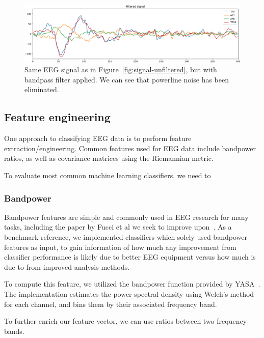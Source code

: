         \begin{figure}[h]
            \includegraphics[width=14cm]{img/raw-signal-postfilter.png}
            \caption{Same EEG signal as in Figure~\ref{fig:signal-unfiltered}, but with bandpass filter applied. We can see that powerline noise has been eliminated.}\label{fig:signal-filtered}
        \end{figure}

    \subsection{Feature engineering}

        One approach to classifying EEG data is to perform feature extraction/engineering. Common features used for EEG data include bandpower ratios, as well as covariance matrices using the Riemannian metric.

        To evaluate most common machine learning classifiers, we need to

        \subsubsection{Bandpower}


            Bandpower features are simple and commonly used in EEG research for many tasks, including the paper by Fucci et al we seek to improve upon~\cite{fucci_replication_2019}. As a benchmark reference, we implemented classifiers which solely used bandpower features as input, to gain information of how much any improvement from classifier performance is likely due to better EEG equipment versus how much is due to from improved analysis methods.

            To compute this feature, we utilized the bandpower function provided by YASA~\cite{vallat_yasa_2020}. The implementation estimates the power spectral density using Welch's method for each channel, and bins them by their associated frequency band.

            To further enrich our feature vector, we can use ratios between two frequency bands.

